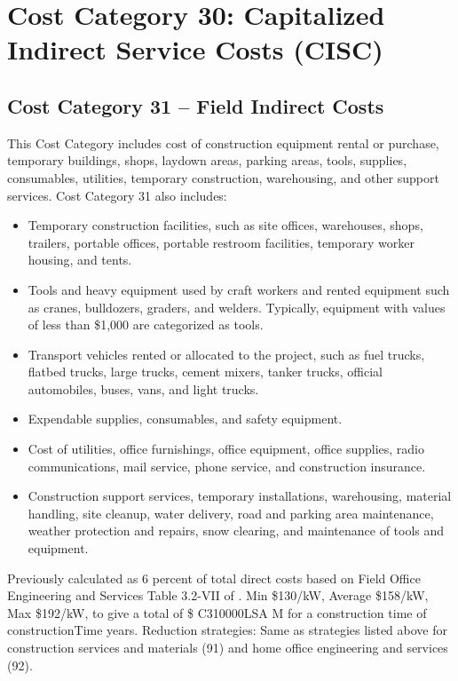 \section{Cost Category 30: Capitalized Indirect Service Costs (CISC)}

\subsection*{Cost Category 31 – Field Indirect Costs}
This Cost Category includes cost of construction equipment rental or purchase, temporary buildings, shops, laydown areas, parking areas, tools, supplies, consumables, utilities, temporary construction, warehousing, and other support services. Cost Category 31 also includes:

\begin{itemize}
    \item Temporary construction facilities, such as site offices, warehouses, shops, trailers, portable offices, portable restroom facilities, temporary worker housing, and tents.
    \item Tools and heavy equipment used by craft workers and rented equipment such as cranes, bulldozers, graders, and welders. Typically, equipment with values of less than \$1,000 are categorized as tools.
    \item Transport vehicles rented or allocated to the project, such as fuel trucks, flatbed trucks, large trucks, cement mixers, tanker trucks, official automobiles, buses, vans, and light trucks.
    \item Expendable supplies, consumables, and safety equipment.
    \item Cost of utilities, office furnishings, office equipment, office supplies, radio communications, mail service, phone service, and construction insurance.
    \item Construction support services, temporary installations, warehousing, material handling, site cleanup, water delivery, road and parking area maintenance, weather protection and repairs, snow clearing, and maintenance of tools and equipment.
\end{itemize}

Previously calculated as 6 percent of total direct costs based on Field Office Engineering and 
Services Table 3.2-VII of \cite{SCH78}.  Min \$130/kW, Average \$158/kW, Max \$192/kW, to give a total of \$ C310000LSA M for a construction time of constructionTime years. Reduction strategies: Same as strategies listed above for construction services and  materials (91) and home office engineering and services (92).\\

